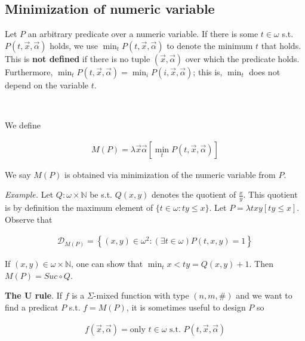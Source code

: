 \documentclass[a4paper, 12pt]{article}
\begin{document}
\subsection{Minimization of numeric variable}

Let $P$ an arbitrary predicate over a numeric variable. If there is some $t \in
\omega$ s.t. $P(t, \overrightarrow{x}, \overrightarrow{\alpha})$ holds, we use
$\min_{t} P(t, \overrightarrow{x}, \overrightarrow{\alpha})$ to denote the
minimum $t$ that holds. This is \textbf{not defined} if there is no tuple
$(\overrightarrow{x}, \overrightarrow{\alpha})$ over which the predicate holds.
Furthermore, $\min_t P(t, \overrightarrow{x}, \overrightarrow{\alpha}) = \min_i
P(i, \overrightarrow{x}, \overrightarrow{\alpha})$; this is, $\min_t$ does not
depend on the variable $t$.

~ 

We define 

\begin{align*}
    M(P) = \lambda \overrightarrow{x}\overrightarrow{\alpha} \left[ \min_t P(t,
    \overrightarrow{x}, \overrightarrow{\alpha}) \right] 
\end{align*}

We say $M(P)$ is obtained via minimization of the numeric variable from $P$.

\textit{Example.} Let $Q : \omega \times \mathbb{N}$ be s.t. $Q(x, y)$ denotes
the quotient of $\frac{x}{y}$. This quotient is by definition the maximum
element of $\{t \in \omega : ty \leq x\}$. Let $P = \lambda txy \left[ ty \leq x
\right] $. Observe that 

\begin{align*}
    \mathcal{D}_{M(P)} = \left\{ (x, y) \in \omega^2 : (\exists t \in \omega)
    P(t, x, y) = 1 \right\} 
\end{align*}

If $(x, y) \in \omega \times \mathbb{N}$, one can show that $\min_t x < ty =
Q(x, y) + 1$. Then $M(P) = Suc \circ Q$.

\textbf{The U rule}. If $f$ is a $\Sigma$-mixed function with type $(n, m, \#)$
and we want to find a predicat $P$ s.t. $f = M(P)$, it is sometimes useful to
design $P$ so  

\begin{align*}
    f(\overrightarrow{x}, \overrightarrow{\alpha}) = \text{only } t \in \omega
    \text{ s.t. } P(t, \overrightarrow{x}, \overrightarrow{\alpha})
\end{align*}
\end{document}
